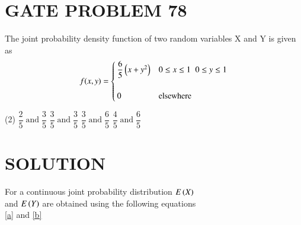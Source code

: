 \documentclass[journal,12pt,twocolumn]{IEEEtran}
\begin{document}
\section{GATE PROBLEM 78} 
The joint probability density function of two random variables X and Y is given as
\[
  f(x,y) =
  \begin{cases}
      \dfrac{6}{5}\left(x + y^{2}\right)  & 0\leq x \leq 1\;\;0\leq y \leq 1 \\ \\
                  0                 & \text{elsewhere} 
  \end{cases}
\] 

\begin{tasks}(2)
\task $\dfrac{2}{5}\;\text{and}\;\dfrac{3}{5}$
\task $\dfrac{3}{5}\;\text{and}\;\dfrac{3}{5}$
\task $\dfrac{3}{5}\;\text{and}\;\dfrac{6}{5}$
\task $\dfrac{4}{5}\;\text{and}\;\dfrac{6}{5}$
\end{tasks}

\bigskip

\section{SOLUTION}
For a continuous joint probability distribution  $E\left(X\right)$ \\
and $E\left(Y\right)$ are obtained using the following equations  \\
\eqref{a} and \eqref{b}
\end{document}
